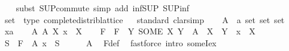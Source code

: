 \begin{isabellebody}
%
\isadelimproof
\ \ %
\endisadelimproof
%
\isatagproof
{}\isamarkupfalse%
\ {\isacharparenleft}{\kern0pt}subst\ SUP{\isacharunderscore}{\kern0pt}commute{\isacharparenright}{\kern0pt}\ {\isacharparenleft}{\kern0pt}simp\ add{\isacharcolon}{\kern0pt}\ inf{\isacharunderscore}{\kern0pt}SUP\ SUP{\isacharunderscore}{\kern0pt}inf{\isacharparenright}{\kern0pt}%
\endisatagproof
{\isafoldproof}%
%
\isadelimproof
\isanewline
%
\endisadelimproof
\isanewline
{}\isamarkupfalse%
\isanewline
\isanewline
{}\isamarkupfalse%
\ set\ {\isacharcolon}{\kern0pt}{\isacharcolon}{\kern0pt}\ {\isacharparenleft}{\kern0pt}type{\isacharparenright}{\kern0pt}\ complete{\isacharunderscore}{\kern0pt}distrib{\isacharunderscore}{\kern0pt}lattice\isanewline
{}\isanewline
{}\isamarkupfalse%
%
\isadelimproof
\ %
\endisadelimproof
%
\isatagproof
{}\isamarkupfalse%
\ {\isacharparenleft}{\kern0pt}standard{\isacharcomma}{\kern0pt}\ clarsimp{\isacharparenright}{\kern0pt}\isanewline
\ \ \isamarkupfalse%
\ A\ {\isacharcolon}{\kern0pt}{\isacharcolon}{\kern0pt}\ {\isachardoublequoteopen}{\isacharparenleft}{\kern0pt}{\isacharparenleft}{\kern0pt}{\isacharprime}{\kern0pt}a\ set{\isacharparenright}{\kern0pt}\ set{\isacharparenright}{\kern0pt}\ set{\isachardoublequoteclose}\isanewline
\ \ \isamarkupfalse%
\ x{\isacharcolon}{\kern0pt}{\isacharcolon}{\kern0pt}{\isacharprime}{\kern0pt}a\isanewline
\ \ \isamarkupfalse%
\ A{\isacharcolon}{\kern0pt}\ {\isachardoublequoteopen}{\isasymforall}{\isasymS}{\isasymin}A{\isachardot}{\kern0pt}\ {\isasymexists}X{\isasymin}{\isasymS}{\isachardot}{\kern0pt}\ x\ {\isasymin}\ X{\isachardoublequoteclose}\isanewline
\ \ \isamarkupfalse%
\ F\ \ {\isachardoublequoteopen}F\ {\isasymequiv}\ {\isasymlambda}Y{\isachardot}{\kern0pt}\ SOME\ X{\isachardot}{\kern0pt}\ Y\ {\isasymin}\ A\ {\isasymand}\ X\ {\isasymin}\ Y\ {\isasymand}\ x\ {\isasymin}\ X{\isachardoublequoteclose}\isanewline
\ \ \isamarkupfalse%
\ {\isachardoublequoteopen}{\isacharparenleft}{\kern0pt}{\isasymforall}S\ {\isasymin}\ F\ {\isacharbackquote}{\kern0pt}\ A{\isachardot}{\kern0pt}\ x\ {\isasymin}\ S{\isacharparenright}{\kern0pt}{\isachardoublequoteclose}\isanewline
\ \ \ \ \isamarkupfalse%
\ A\ \isamarkupfalse%
\ F{\isacharunderscore}{\kern0pt}def\ \isamarkupfalse%
\ {\isacharparenleft}{\kern0pt}fastforce\ intro{\isacharcolon}{\kern0pt}\ someI{}{\isacharunderscore}{\kern0pt}ex{\isacharparenright}{\kern0pt}\isanewline

\end{isabellebody}

